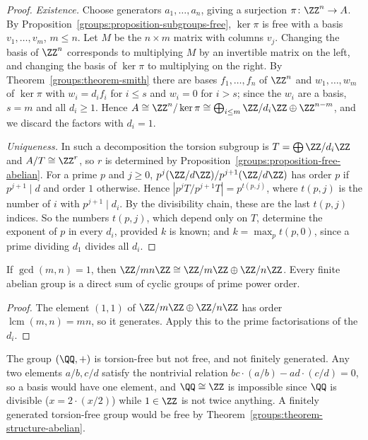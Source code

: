 \begin{proof}
\emph{Existence.} Choose generators $a_1, \ldots, a_n$, giving a surjection
$\pi \colon \ZZ^n \to A$. By Proposition~\ref{groups:proposition-subgroups-free},
$\ker \pi$ is free with a basis $v_1, \ldots, v_m$, $m \leq n$. Let $M$ be the $n \times m$
matrix with columns $v_j$. Changing the basis of $\ZZ^n$ corresponds to multiplying $M$
by an invertible matrix on the left, and changing the basis of $\ker \pi$ to multiplying
on the right. By Theorem~\ref{groups:theorem-smith} there are bases
$f_1, \ldots, f_n$ of $\ZZ^n$ and $w_1, \ldots, w_m$ of $\ker \pi$ with $w_i = d_i f_i$ for
$i \leq s$ and $w_i = 0$ for $i > s$; since the $w_i$ are a basis, $s = m$ and all $d_i \geq 1$.
Hence $A \cong \ZZ^n / \ker\pi \cong \bigoplus_{i \leq m} \ZZ/d_i\ZZ \oplus \ZZ^{n-m}$, and we
discard the factors with $d_i = 1$.

\emph{Uniqueness.} In such a decomposition the torsion subgroup is
$T = \bigoplus \ZZ/d_i\ZZ$ and $A/T \cong \ZZ^r$, so $r$ is determined by
Proposition~\ref{groups:proposition-free-abelian}. For a prime $p$ and $j \geq 0$,
$p^j(\ZZ/d\ZZ)/p^{j+1}(\ZZ/d\ZZ)$ has order $p$ if $p^{j+1} \mid d$ and order $1$
otherwise. Hence $|p^jT/p^{j+1}T| = p^{t(p, j)}$, where $t(p, j)$ is the number of
$i$ with $p^{j+1} \mid d_i$. By the divisibility chain, these are the last $t(p,j)$ indices.
So the numbers $t(p, j)$, which depend only on $T$, determine the exponent of $p$ in
every $d_i$, provided $k$ is known; and $k = \max_p t(p, 0)$, since a prime dividing
$d_1$ divides all $d_i$.
\end{proof}

\begin{corollary}\label{groups:corollary-chinese-remainder}
If $\gcd(m, n) = 1$, then $\ZZ/mn\ZZ \cong \ZZ/m\ZZ \oplus \ZZ/n\ZZ$. Every finite abelian group is
a direct sum of cyclic groups of prime power order.
\end{corollary}

\begin{proof}
The element $(1, 1)$ of $\ZZ/m\ZZ \oplus \ZZ/n\ZZ$ has order $\operatorname{lcm}(m,n) = mn$, so it
generates. Apply this to the prime factorisations of the $d_i$.
\end{proof}

\begin{counterexample}\label{groups:counterexample-rationals-not-free}
The group $(\QQ, +)$ is torsion-free but not free, and not finitely generated. Any two
elements $a/b, c/d$ satisfy the nontrivial relation $bc \cdot (a/b) - ad \cdot (c/d) = 0$,
so a basis would have one element, and $\QQ \cong \ZZ$ is impossible since
$\QQ$ is divisible ($x = 2 \cdot (x/2)$) while $1 \in \ZZ$ is not twice anything. A
finitely generated torsion-free group would be free by
Theorem~\ref{groups:theorem-structure-abelian}.
\end{counterexample}


